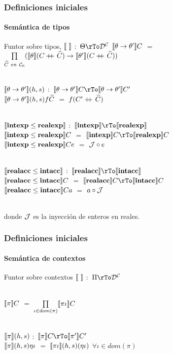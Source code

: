 \documentclass{beamer} %
\begin{document}
\begin{frame}\small
\frametitle{Definiciones iniciales}
\framesubtitle{Sem\'antica de tipos}

\begin{block}{Funtor sobre tipos, $\semBrcks{ \ }$ $:$ $\Theta \rTo \DC$}
$\llbracket  \theta \rightarrow \theta'  \rrbracket C$ $=$
$\prod\limits_{\widehat{C} \ en \ \mathcal{C}_0} 
(\llbracket  \theta  \rrbracket(C +\kern-1.3ex+\kern0.8ex \widehat{C}) \rightarrow  \llbracket  \theta'  \rrbracket(C +\kern-1.3ex+\kern0.8ex \widehat{C}))$ \\
\

$\llbracket  \theta \rightarrow \theta'  \rrbracket(h,s)$ 
$:$ $\semBrcks{ \theta \rightarrow \theta' }C \rTo \semBrcks{ \theta \rightarrow \theta' }C'$\\
$\llbracket  \theta \rightarrow \theta'  \rrbracket(h,s)f\widehat{C}$ $=$ $f(C' +\kern-1.3ex+\kern0.8ex \widehat{C})$\\
\

$\llbracket \textbf{intexp} \leq \textbf{realexp} \rrbracket$ $:$ $\semBrcks{\intexp} \rTo \semBrcks{\realexp}$\\
$\llbracket \textbf{intexp} \leq \textbf{realexp} \rrbracket C$ $=$ $\semBrcks{\intexp}C \rTo \semBrcks{\realexp}C$\\
$\llbracket \textbf{intexp} \leq \textbf{realexp} \rrbracket Ce$ $=$ $\mathcal{J} \circ e$ \\
\

$\llbracket \textbf{realacc} \leq \textbf{intacc} \rrbracket$ $:$ $\semBrcks{\realacc} \rTo \semBrcks{\intacc}$\\
$\llbracket \textbf{realacc} \leq \textbf{intacc} \rrbracket C$ $=$ $\semBrcks{\realacc}C \rTo \semBrcks{\intacc}C$\\
$\llbracket \textbf{realacc} \leq \textbf{intacc} \rrbracket Ca$ $=$ $a \circ \mathcal{J}$ \\
\

donde $\mathcal{J}$ es la inyecci\'on de enteros en reales.\\
\end{block}
\end{frame}

\begin{frame}
\frametitle{Definiciones iniciales}
\framesubtitle{Sem\'antica de contextos}

\begin{block}{Funtor sobre contextos}
$\semBrcks{ \ }$ $:$ $\Pi \rTo \DC$\\
\

$\llbracket \pi \rrbracket C$ $=$ $\prod\limits_{\iota \in dom(\pi)} \llbracket \pi \iota \rrbracket C$\\
\

$\llbracket \pi \rrbracket(h,s)$ $:$ $\semBrcks{\pi}C \rTo \semBrcks{\pi'}C'$\\
$\llbracket \pi \rrbracket(h,s)\eta\iota$ $=$ $\llbracket \pi \iota \rrbracket(h,s)(\eta\iota)$ $\forall \iota \in dom(\pi)$\\

\end{block}
\end{frame}
\end{document}
